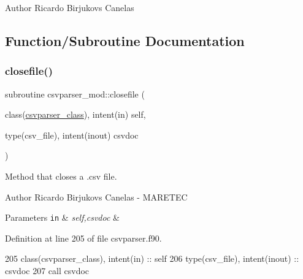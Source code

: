 \begin{DoxyAuthor}{Author}
Ricardo Birjukovs Canelas 
\end{DoxyAuthor}


\subsection{Function/\+Subroutine Documentation}
\mbox{\label{namespacecsvparser__mod_a8f56a69c948d139a3e9c88476f25305d}} 
\subsubsection{\texorpdfstring{closefile()}{closefile()}}
{\footnotesize\ttfamily subroutine csvparser\+\_\+mod\+::closefile (\begin{DoxyParamCaption}\item[{class(\mbox{\hyperlink{structcsvparser__mod_1_1csvparser__class}{csvparser\+\_\+class}}), intent(in)}]{self,  }\item[{type(csv\+\_\+file), intent(inout)}]{csvdoc }\end{DoxyParamCaption})\hspace{0.3cm}{\ttfamily [private]}}



Method that closes a .csv file. 

\begin{DoxyAuthor}{Author}
Ricardo Birjukovs Canelas -\/ M\+A\+R\+E\+T\+EC 
\end{DoxyAuthor}

\begin{DoxyParams}[1]{Parameters}
\mbox{\tt in}  & {\em self,csvdoc} & \\
\hline
\end{DoxyParams}


Definition at line 205 of file csvparser.\+f90.


\begin{DoxyCode}
205     \textcolor{keywordtype}{class}(csvparser\_class), \textcolor{keywordtype}{intent(in)} :: self
206     \textcolor{keywordtype}{type}(csv\_file), \textcolor{keywordtype}{intent(inout)} :: csvdoc
207     \textcolor{keyword}{call }csvdoc%
\end{DoxyCode}
\mbox{\label{namespacecsvparser__mod_ae966faafebb8c4035e12e0bb24de717c}} 

